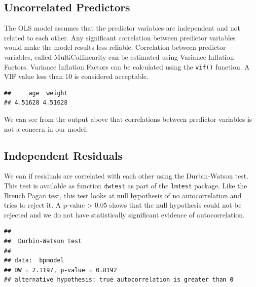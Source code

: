 \documentclass[11pt, letterpaper, twoside]{memoir}\usepackage{knitr}
\begin{document}
\subsection{Uncorrelated Predictors}

The OLS model assumes that the predictor variables are independent and not related to each other. Any significant correlation between predictor variables would make the model results less reliable. Correlation between predictor variables, called MultiCollinearity  can be estimated using Variance Inflation Factors. Variance Inflation Factors can be calculated using the \texttt{vif()}  function. A VIF value less than 10 is considered acceptable.

\begin{knitrout}
\color{fgcolor}\begin{kframe}
\begin{alltt}
\end{alltt}
\begin{verbatim}
##     age  weight 
## 4.51628 4.51628
\end{verbatim}
\end{kframe}
\end{knitrout}

We can see from the output above that correlations between predictor variables is not a concern in our model.

\subsection{Independent Residuals}

We can if residuals are correlated with each other using the Durbin-Watson test. This test is available as function \texttt{dwtest} as part of the \texttt{lmtest} package. Like the Breuch Pagan test, this test looks at null hypothesis of no autocorrelation and tries to reject it. A p-value > 0.05 shows that the null hypothesis could not be rejected and we do not have statistically significant evidence of autocorrelation.

\begin{knitrout}
\color{fgcolor}\begin{kframe}
\begin{alltt}
\end{alltt}
\begin{verbatim}
## 
## 	Durbin-Watson test
## 
## data:  bpmodel
## DW = 2.1197, p-value = 0.8192
## alternative hypothesis: true autocorrelation is greater than 0
\end{verbatim}
\end{kframe}
\end{knitrout}
\end{document}
